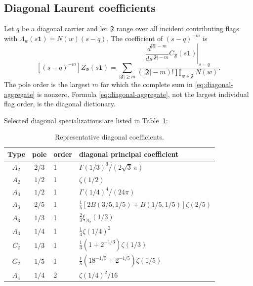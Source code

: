 \documentclass[11pt]{article}
\renewcommand{\boxed}[1]{#1}
\newcommand{\bfone}{\mathbf 1}
\begin{document}
\subsection{Diagonal Laurent coefficients}

Let \(q\) be a diagonal carrier and let \(\mathfrak F\) range over all
incident contributing flags with
\(\Lambda_w(s\bfone)=N(w)(s-q)\).  The coefficient of
\((s-q)^{-m}\) is
\begin{equation}\label{eq:diagonal-aggregate}
 \boxed{
 [(s-q)^{-m}]Z_\Phi(s\bfone)
 =\sum_{|\mathfrak F|\ge m}
 \frac{
  \left.\dfrac{d^{|\mathfrak F|-m}}{ds^{|\mathfrak F|-m}}
  C_{\mathfrak F}(s\bfone)\right|_{s=q}}
 {(|\mathfrak F|-m)!\prod_{w\in\mathfrak F}N(w)}.}
\end{equation}
The pole order is the largest \(m\) for which the complete sum in
\eqref{eq:diagonal-aggregate} is nonzero.  Formula
\eqref{eq:diagonal-aggregate}, not the largest individual flag order,
is the diagonal dictionary.

Selected diagonal specializations are listed in Table~\ref{tab:diagonal-certificate}:
\begin{table}[ht]
\centering
\small
\begin{tabularx}{\textwidth}{@{}cclX@{}}
\toprule
Type & pole & order & diagonal principal coefficient\\
\midrule
\(A_2\)&\(2/3\)&1&\(\Gamma(1/3)^3/(2\sqrt3\,\pi)\)\\
\(A_2\)&\(1/2\)&1&\(\zeta(1/2)\)\\
\(A_3\)&\(1/2\)&1&\(\Gamma(1/4)^4/(24\pi)\)\\
\(A_3\)&\(2/5\)&1&
\(\frac15[2B(3/5,1/5)+B(1/5,1/5)]\zeta(2/5)\)\\
\(A_3\)&\(1/3\)&1&\(\frac23\xi_{A_2}(1/3)\)\\
\(A_3\)&\(1/4\)&1&\(\frac14\zeta(1/4)^2\)\\
\(C_2\)&\(1/3\)&1&
\(\frac13(1+2^{-1/3})\zeta(1/3)\)\\
\(G_2\)&\(1/5\)&1&
\(\frac15(18^{-1/5}+2^{-1/5})\zeta(1/5)\)\\
\(A_4\)&\(1/4\)&2&\(\zeta(1/4)^2/16\)\\
\bottomrule
\end{tabularx}
\caption{Representative diagonal coefficients.}
\label{tab:diagonal-certificate}
\end{table}
\end{document}
